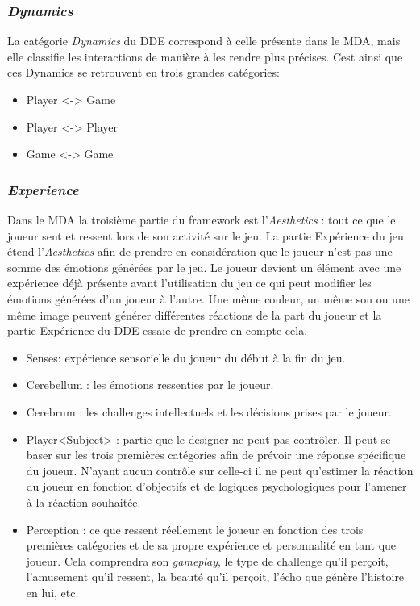 \subsubsection{\emph{Dynamics} }
    La catégorie \emph{Dynamics} du DDE correspond à celle présente dans le MDA, mais elle classifie les interactions de manière à les rendre plus précises. Cest ainsi que ces Dynamics se retrouvent en trois grandes catégories: 
    \begin{itemize}
        \item Player <-> Game
        \item Player <-> Player
        \item Game <-> Game
    \end{itemize}

\subsubsection{\emph{Experience}}
    Dans le MDA la troisième partie du framework est l'\emph{Aesthetics} : tout ce que le joueur sent et ressent lors de son activité sur le jeu. 
    La partie Expérience du jeu étend l'\emph{Aesthetics} afin de prendre en considération que le joueur n'est pas une somme des émotions générées par le jeu. 
    Le joueur devient un élément avec une expérience déjà présente avant l'utilisation du jeu ce qui peut modifier les émotions générées d'un joueur à l'autre. Une même couleur, un même son ou une même image peuvent générer différentes réactions de la part du joueur et la partie Expérience du DDE essaie de prendre en compte cela.
    \begin{itemize}
        \item Senses: expérience sensorielle du joueur du début à la fin du jeu.
        \item Cerebellum : les émotions ressenties par le joueur.
        \item Cerebrum : les challenges intellectuels et les décisions prises par le joueur.
        \item Player<Subject> : partie que le designer ne peut pas contrôler. Il peut se baser sur les trois premières catégories afin de prévoir une réponse spécifique du joueur. N'ayant aucun contrôle sur celle-ci il ne peut qu'estimer la réaction du joueur en fonction d'objectifs et de logiques psychologiques pour l'amener à la réaction souhaitée.
        \item Perception : ce que ressent réellement le joueur en fonction des trois premières catégories et de sa propre expérience et personnalité en tant que joueur. Cela comprendra son \emph{gameplay}, le type de challenge qu'il perçoit, l'amusement qu'il ressent, la beauté qu'il perçoit, l'écho que génère l'histoire en lui, etc.
    \end{itemize}


